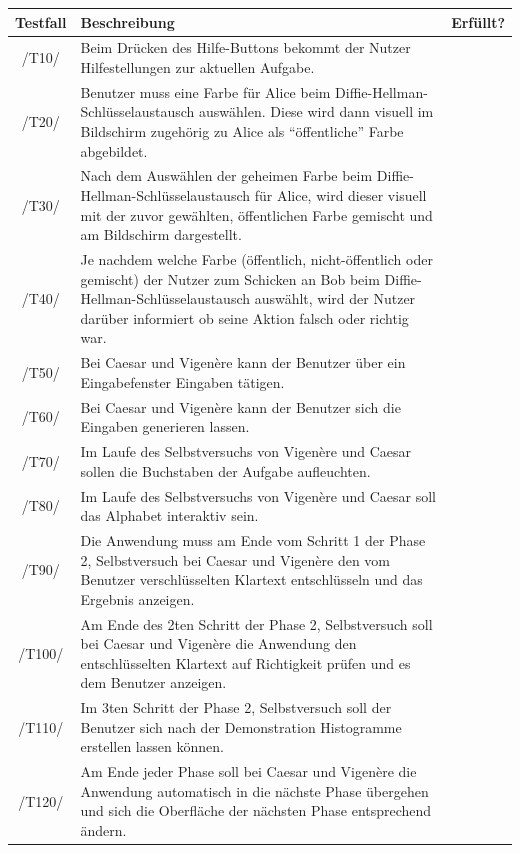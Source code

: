 \documentclass{article}
\newcommand{\cmark}{\ding{51}}
\begin{document}
  \begin{table}[H]
    \begin{tabularx}{\textwidth}{| c | >{\raggedright\arraybackslash}X | c |}
      \hline
      \textbf{Testfall} & \textbf{Beschreibung} & \textbf{Erfüllt?} \\
      \hline
      /T10/ & Beim Drücken des Hilfe-Buttons bekommt der Nutzer Hilfestellungen zur aktuellen Aufgabe. & \cmark \\
      \hline
      /T20/ & Benutzer muss eine Farbe für Alice beim Diffie-Hellman-Schlüsselaustausch auswählen. Diese wird dann visuell im Bildschirm zugehörig zu Alice als ``öffentliche'' Farbe abgebildet. & \cmark \\
      \hline
      /T30/ & Nach dem Auswählen der geheimen Farbe beim Diffie-Hellman-Schlüssel\-aus\-tausch für Alice, wird dieser visuell mit der zuvor gewählten, öffentlichen Farbe gemischt und am Bildschirm dargestellt. & \cmark \\
      \hline
      /T40/ & Je nachdem welche Farbe (öffentlich, nicht-öffentlich oder gemischt) der Nutzer zum Schicken an Bob beim Diffie-Hellman-Schlüsselaustausch auswählt, wird der Nutzer darüber informiert ob seine Aktion falsch oder richtig war. & \cmark \\
      \hline
      /T50/ & Bei Caesar und Vigenère kann der Benutzer über ein Eingabefenster Eingaben tätigen. & \cmark \\
      \hline
      /T60/ & Bei Caesar und Vigenère kann der Benutzer sich die Eingaben generieren lassen. & \cmark \\
      \hline
      /T70/ & Im Laufe des Selbstversuchs von Vigenère und Caesar sollen die Buchstaben der Aufgabe aufleuchten. & \cmark \\
      \hline
      /T80/ & Im Laufe des Selbstversuchs von Vigenère und Caesar soll das Alphabet interaktiv sein. & \cmark \\
      \hline
      /T90/ & Die Anwendung muss am Ende vom Schritt 1 der Phase 2, Selbstversuch bei Caesar und Vigenère den vom 
       Benutzer verschlüsselten Klartext entschlüsseln und das Ergebnis anzeigen. & \cmark \\
      \hline
      /T100/ & Am Ende des 2ten Schritt der Phase 2, Selbstversuch soll bei Caesar und Vigenère die Anwendung den entschlüsselten Klartext 
       auf Richtigkeit prüfen und es dem Benutzer anzeigen. & \cmark \\
      \hline
      /T110/ & Im 3ten Schritt der Phase 2, Selbstversuch soll der Benutzer sich nach der Demonstration Histogramme erstellen lassen können. & \cmark \\
      \hline
      /T120/ & Am Ende jeder Phase soll bei Caesar und Vigenère die Anwendung automatisch in die nächste Phase übergehen und sich die Oberfläche 
       der nächsten Phase entsprechend ändern. & \cmark \\
      \hline
    \end{tabularx}
  \end{table}
  
\end{document}
